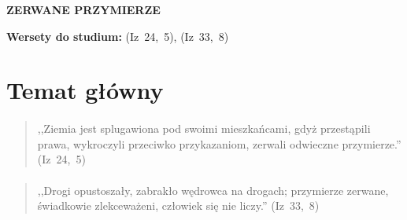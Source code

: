 \documentclass[10pt,a4paper,oneside]{article}
\begin{document}
\centerline{\textbf{\MakeUppercase{Zerwane przymierze}}}
\begin{center}
\textbf{Wersety do studium:} \mbox{(Iz 24, 5)}, \mbox{(Iz 33, 8)}
\end{center}
\section{Temat główny}
\paragraph{}
\begin{quote}
,,Ziemia jest splugawiona pod swoimi mieszkańcami, gdyż przestąpili prawa, wykroczyli przeciwko przykazaniom, zerwali odwieczne przymierze.'' \mbox{(Iz 24, 5)}
\end{quote}
\paragraph{}
\begin{quote}
,,Drogi opustoszały, zabrakło wędrowca na drogach; przymierze zerwane, świadkowie zlekceważeni, człowiek się nie liczy.'' \mbox{(Iz 33, 8)}
\end{quote}
\end{document}
